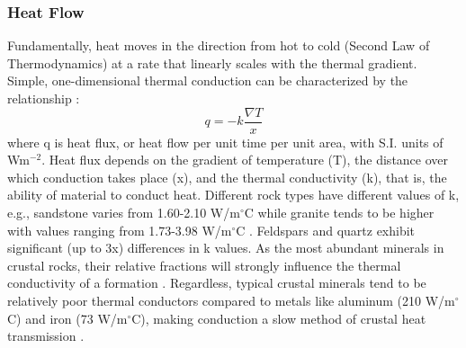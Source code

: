 \subsubsection{Heat Flow}\label{ch2:heatflow}
Fundamentally, heat moves in the direction from hot to cold (Second Law of Thermodynamics) at a rate that linearly scales with the thermal gradient. Simple, one-dimensional thermal conduction can be characterized by the relationship \citep[~p. 270]{fowler_solid_2005}:
\begin{equation}\label{eq:conduction}
q = -k \frac{\nabla T}{x}
\end{equation}
where q is heat flux, or heat flow per unit time per unit area, with S.I. units of Wm$^{-2}$. Heat flux depends on the gradient of temperature (T), the distance over which conduction takes place (x), and the thermal conductivity (k), that is, the ability of material to conduct heat. Different rock types have different values of k, e.g., sandstone varies from 1.60-2.10 W/m$^\circ$C while granite tends to be higher with values ranging from 1.73-3.98 W/m$^\circ$C \citep[~p. 30]{dipippo_geothermal_2012}. Feldspars and quartz exhibit significant (up to 3x) differences in k values. As the most abundant minerals in crustal rocks, their relative fractions will strongly influence the thermal conductivity of a formation \citep[~p. 22]{glassley_geothermal_2015}. Regardless, typical crustal minerals tend to be relatively poor thermal conductors compared to metals like aluminum (210 W/m$^\circ$C) and iron (73 W/m$^\circ$C), making conduction a slow method of crustal heat transmission \citep[~p. 23]{dipippo_geothermal_2012}.

